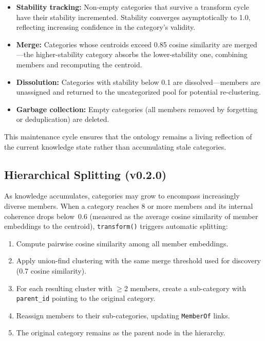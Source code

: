 \begin{itemize}[nosep]
    \item \textbf{Stability tracking:} Non-empty categories that survive a
    transform cycle have their stability incremented. Stability converges
    asymptotically to 1.0, reflecting increasing confidence in the
    category's validity.
    \item \textbf{Merge:} Categories whose centroids exceed 0.85 cosine
    similarity are merged---the higher-stability category absorbs the
    lower-stability one, combining members and recomputing the centroid.
    \item \textbf{Dissolution:} Categories with stability below 0.1
    are dissolved---members are unassigned and returned to the uncategorized
    pool for potential re-clustering.
    \item \textbf{Garbage collection:} Empty categories (all members removed
    by forgetting or deduplication) are deleted.
\end{itemize}

This maintenance cycle ensures that the ontology remains a living reflection
of the current knowledge state rather than accumulating stale categories.

\subsection{Hierarchical Splitting (v0.2.0)}

As knowledge accumulates, categories may grow to encompass increasingly
diverse members. When a category reaches 8 or more members and its internal
coherence drops below~0.6 (measured as the average cosine similarity of
member embeddings to the centroid), \texttt{transform()} triggers automatic
splitting:

\begin{enumerate}[nosep]
    \item Compute pairwise cosine similarity among all member embeddings.
    \item Apply union-find clustering with the same merge threshold used for
    discovery (0.7 cosine similarity).
    \item For each resulting cluster with $\geq$2 members, create a
    sub-category with \texttt{parent\_id} pointing to the original category.
    \item Reassign members to their sub-categories, updating
    \texttt{MemberOf} links.
    \item The original category remains as the parent node in the hierarchy.
\end{enumerate}

